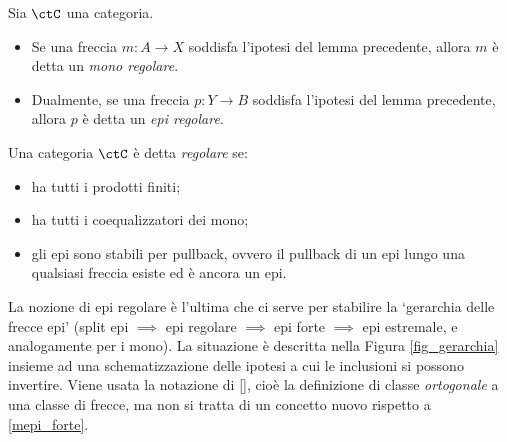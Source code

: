 \begin{definition}\label{def_epi_mono_regolari}
	Sia \(\ctC\) una	categoria.
	\begin{itemize}
		\item Se una freccia \(m \colon A \to X\) soddisfa l'ipotesi del lemma precedente, allora \(m\) è detta un \emph{mono regolare}.
		\item Dualmente, se una freccia \(p \colon Y \to B\)	soddisfa l'ipotesi del lemma precedente, allora \(p\) è detta un \emph{epi regolare}.
	\end{itemize}
\end{definition}
\begin{definition}\label{def_cat_regolare}
	\color{red}
	Una categoria \(\ctC\) è detta \emph{regolare} se:
	\begin{itemize}
		\item ha tutti i prodotti finiti;
		\item ha tutti i coequalizzatori dei mono;
		\item gli epi sono stabili per pullback, ovvero il pullback di un epi lungo una qualsiasi freccia esiste ed è ancora un epi.
	\end{itemize}
\end{definition}
\begin{remark}
	La nozione di epi regolare è l'ultima	che ci serve per stabilire la `gerarchia delle frecce epi' (split epi \(\implies\)	epi regolare \(\implies\)	epi forte \(\implies\)	epi estremale, e analogamente per i mono). La situazione è descritta nella Figura \ref{fig_gerarchia} insieme ad una schematizzazione delle ipotesi a cui le inclusioni si possono invertire. Viene usata la notazione di \ref{}, cioè la definizione di classe \emph{ortogonale} a una classe di frecce, ma non si tratta di un concetto nuovo rispetto a \ref{mepi_forte}.
\end{remark}
